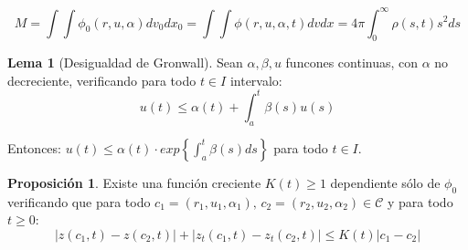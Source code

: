 \documentclass[a4paper,10pt]{scrartcl}
\theoremstyle{definition}
\newtheorem{lemma}{Lema}
\newtheorem{fact}{Proposición}
\numberwithin{equation}{section}
\begin{document}
\[ 
    M = \int\int \phi_0(r,u,\alpha) dv_0 dx_0 = \int\int \phi(r,u,\alpha,t) dv dx = 4\pi \int_0^{\infty} \rho(s,t) s^2 ds 
\]

\begin{lemma}[Desigualdad de Gronwall]
Sean $\alpha, \beta, u$ funcones continuas, con $\alpha$ no decreciente, verificando para todo $t\in I$ intervalo:
\[
 u(t) \le \alpha(t) + \int_a^t \beta(s) u(s)
\]

Entonces: $u(t) \le \alpha(t) \cdot exp\left\{\int_a^t \beta(s) ds\right\}$ para todo $t\in I$.
\end{lemma}

\begin{fact}
 Existe una función creciente $K(t) \ge 1$ dependiente sólo de $\phi_0$ verificando que para todo $c_1=(r_1,u_1,\alpha_1), \, c_2=(r_2,u_2,\alpha_2) \in \mathcal{C}$ y para todo $t\ge 0$:
 \[|z(c_1,t) - z(c_2,t)| + |z_t(c_1,t) - z_t(c_2,t)| \le K(t)|c_1 - c_2|\]
\end{fact}
\end{document}

